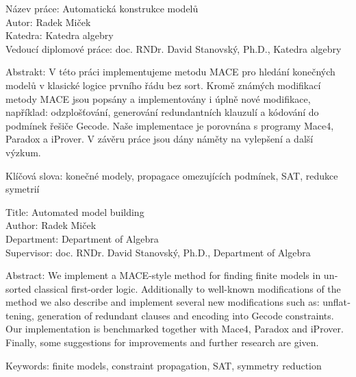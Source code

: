 \documentclass{cs-dipl}
\begin{document}
\newpage

\renewcommand\thepage{Abstrakt}

\noindent
Název práce: Automatická konstrukce modelů\\
Autor: Radek Miček\\
Katedra: Katedra algebry\\
Vedoucí diplomové práce: doc. RNDr. David Stanovský, Ph.D., Katedra algebry

\bigskipamount

\noindent Abstrakt:
V této práci implementujeme metodu MACE pro hledání konečných
modelů v klasické logice prvního řádu bez sort.
Kromě známých modifikací metody MACE jsou popsány
a implementovány i úplně nové modifikace, například:
odzplošťování, generování redundantních klauzulí
a kódování do podmínek řešiče Gecode. Naše implementace
je porovnána s programy Mace4, Paradox a iProver.
V závěru práce jsou dány náměty na vylepšení a další výzkum.

\bigskip

\noindent Klíčová slova: konečné modely, propagace omezujících podmínek, SAT,
  redukce symetrií

\bigskipamount

\noindent
Title: Automated model building\\
Author: Radek Miček\\
Department: Department of Algebra\\
Supervisor: doc. RNDr. David Stanovský, Ph.D., Department of Algebra

\bigskipamount

\noindent Abstract:
\foreignlanguage{english}{
We implement a MACE-style method for finding finite models
in unsorted classical first-order logic. Additionally to well-known
modifications of the method we also describe and implement several
new modifications such as: unflattening, generation of redundant clauses
and encoding into Gecode constraints. Our implementation
is benchmarked together with Mace4, Paradox and iProver.
Finally, some suggestions for improvements and further
research are given.
}

\bigskip

\noindent Keywords: finite models, constraint propagation, SAT,
  symmetry reduction

\newpage

\renewcommand\thepage{Obsah}

\end{document}
